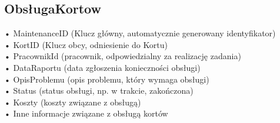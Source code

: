 \documentclass{article}
\begin{document}
\subsection*{ObsługaKortow}
•	MaintenanceID (Klucz główny, automatycznie generowany identyfikator)\\
•	KortID (Klucz obcy, odniesienie do Kortu)\\
•	PracownikId (pracownik, odpowiedzialny za realizację zadania)\\
•	DataRaportu (data zgłoszenia konieczności obsługi)\\
•	OpisProblemu (opis problemu, który wymaga obsługi)\\
•	Status (status obsługi, np. w trakcie, zakończona)\\
•	Koszty (koszty związane z obsługą)\\
•	Inne informacje związane z obsługą kortów
\end{document}
